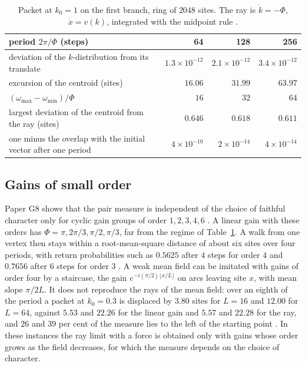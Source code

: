 \begin{table}[ht]\centering\small
\begin{tabular}{@{}p{}rrr@{}}\toprule
period $2\pi/\Phi$ (steps) & 64 & 128 & 256\\\midrule
deviation of the $k$-distribution from its translate & $1.3\times10^{-12}$ & $2.1\times10^{-12}$ & $3.4\times10^{-12}$\\
excursion of the centroid (sites) & $16.06$ & $31.99$ & $63.97$\\
$(\omega_{\max}-\omega_{\min})/\Phi$ & $16$ & $32$ & $64$\\
largest deviation of the centroid from the ray (sites) & $0.646$ & $0.618$ & $0.611$\\
one minus the overlap with the initial vector after one period & $4\times10^{-10}$ & $2\times10^{-14}$ & $4\times10^{-14}$\\\bottomrule
\end{tabular}
\caption{Packet at $k_0=1$ on the first branch, ring of $2048$ sites. The ray is $\dot k=-\Phi$, $\dot x=v(k)$, integrated with the midpoint rule \cite{comp3}.}\label{tab:field}
\end{table}

\subsection{Gains of small order}
Paper G8 shows that the pair measure is independent of the choice of faithful character only for cyclic gain groups of order $1,2,3,4,6$ \cite{g8}. A linear gain with these orders has $\Phi=\pi,2\pi/3,\pi/2,\pi/3$, far from the regime of Table~\ref{tab:field}. A walk from one vertex then stays within a root-mean-square distance of about six sites over four periods, with return probabilities such as $0.5625$ after $4$ steps for order $4$ and $0.7656$ after $6$ steps for order $3$ \cite{comp3}. A weak mean field can be imitated with gains of order four by a staircase, the gain $e^{-i(\pi/2)\lfloor x/L\rfloor}$ on arcs leaving site $x$, with mean slope $\pi/2L$. It does not reproduce the rays of the mean field: over an eighth of the period a packet at $k_0=0.3$ is displaced by $3.80$ sites for $L=16$ and $12.00$ for $L=64$, against $5.53$ and $22.26$ for the linear gain and $5.57$ and $22.28$ for the ray, and $26$ and $39$ per cent of the measure lies to the left of the starting point \cite{comp3}. In these instances the ray limit with a force is obtained only with gains whose order grows as the field decreases, for which the measure depends on the choice of character.

